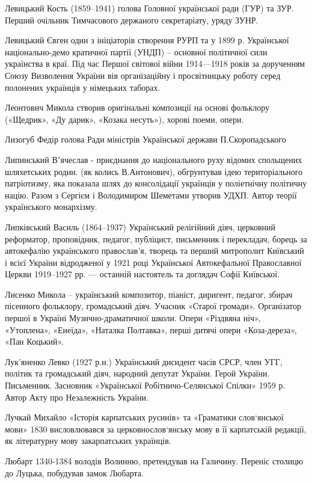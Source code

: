 Левицький Кость (1859–1941) голова Головної української ради (ГУР) та ЗУР. Перший очільник Тимчасового держаного секретаріату, уряду ЗУНР. 

Левицький Євген один з ініціаторів створення  РУРП та у 1899 р. Української національно-демо кратичної партії (УНДП) – основної політичної сили українства в краї. Під час Першої світової війни 1914—1918 років  за дорученням Союзу Визволення України вів організаційну і просвітницьку роботу серед полонених українців у німецьких таборах. 

Леонтович Микола створив оригінальні композиції на основі фольклору («Щедрик», «Ду дарик», «Козака несуть»), хорові поеми, опери.  

Лизогуб Федір голова Ради міністрів Української держави П.Скоропадського

Липинський Вʼячеслав - приєднання до національного руху відомих спольщених шляхетських родин. (як колись В.Антонович), обгрунтував ідею територіального патріотизму, яка показала шлях до консолідації українців у поліетнічну політичну націю. Разом з Сергієм і Володимиром Шеметами утворив УДХП. Автор теорії українського монархізму.

Липківський Василь (1864–1937) Український релігійний діяч, церковний реформатор, проповідник, педагог, публіцист, письменник і перекладач, борець за автокефалію українського православ’я, творець та перший митрополит Київський і всієї України відродженої у 1921 році Української Автокефальної Православної Церкви 1919–1927 рр. — останній настоятель та доглядач Софії Київської.

Лисенко Микола – український композитор, піаніст, диригент, педагог, збирач пісенного фольклору, громадський діяч. Учасник «Старої громади». Організатор першої в Україні Музично-драматичної школи. Опери «Різдвяна ніч», «Утоплена», «Енеїда», «Наталка Полтавка», перші дитячі опери «Коза-дереза», «Пан Коцький». 

Лук’яненко Левко  (1927 р.н.) Український дисидент часів СРСР, член УГГ, політик та громадський діяч, народний депутат України. Герой України. Письменник. Засновник «Української Робітничо-Селянської Спілки» 1959 р. Автор Акту про Незалежність України.

Лучкай Михайло «Історія карпатських русинів» та «Граматики слов‘янської мови» 1830 висловлювався за церковнослов‘янську мову в її карпатській редакції, як літературну мову закарпатських українців.

Любарт 1340-1384 володів Волинню, претендував на Галичину. Переніс столицю до Луцька, побудував замок Любарта.

